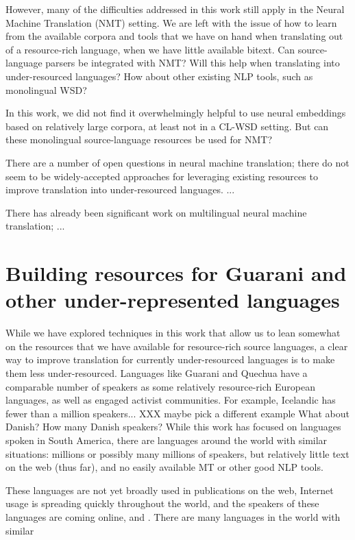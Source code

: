 However, many of the difficulties addressed in this work still apply in the
Neural Machine Translation (NMT) setting. We are left with the issue of how to
learn from the available corpora and tools that we have on hand when
translating out of a resource-rich language, when we have little available
bitext. Can source-language parsers be integrated with NMT? Will this help when
translating into under-resourced languages?
How about other existing NLP tools, such as monolingual WSD?

In this work, we did not find it overwhelmingly helpful to use neural
embeddings based on relatively large corpora, at least not in a CL-WSD setting.
But can these monolingual source-language resources be used for NMT?

There are a number of open questions in neural machine translation; there do
not seem to be widely-accepted approaches for leveraging existing resources to
improve translation into under-resourced languages. ... %

There has already been significant work on multilingual neural machine
translation; ...
\cite{TACL1081}



\section{Building resources for Guarani and other under-represented languages}
\label{sec:crowdsourcing}

While we have explored techniques in this work that allow us to lean
somewhat on the resources that we have available for resource-rich source
languages, a clear way to improve translation for currently under-resourced
languages is to make them less under-resourced. Languages like Guarani and
Quechua have a comparable number of speakers as some relatively resource-rich
European languages, as well as engaged activist communities. For example,
Icelandic has fewer than a million speakers... XXX maybe pick a different
example
What about Danish? How many Danish speakers?
While this work has focused on languages spoken in South America, there are
languages around the world with similar situations: millions or possibly many
millions of speakers, but relatively little text on the web (thus far), and no
easily available MT or other good NLP tools.

These languages are not yet broadly used in publications on the web,
Internet usage is spreading quickly throughout the world, and
the speakers of these languages are coming online, and . There are many languages in
the world with similar 

